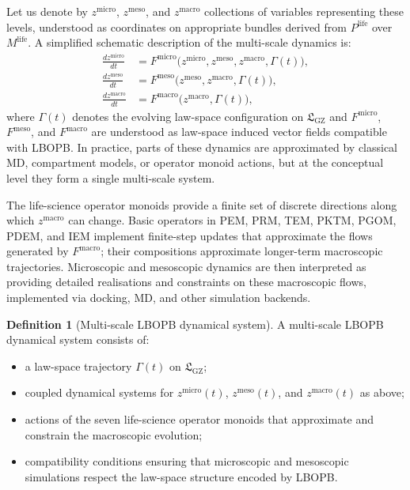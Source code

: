 \documentclass[11pt]{book}
\theoremstyle{plain}
\theoremstyle{definition}
\newtheorem{definition}[theorem]{Definition}
\theoremstyle{remark}
\newcommand{\GZLS}{\ensuremath{\mathfrak{L}_{\mathrm{GZ}}}}       \newcommand{\GZLT}{\ensuremath{M_{!w}}}                           \newcommand{\GZLOC}{\ensuremath{A_M}}                             \newcommand{\GZLCurv}{\ensuremath{\mathcal{F}_{\mathrm{law}}}}
\begin{document}
Let us denote by $z^{\mathrm{micro}}$, $z^{\mathrm{meso}}$, and
$z^{\mathrm{macro}}$ collections of variables representing these
levels, understood as coordinates on appropriate bundles derived from
$P^{\mathrm{life}}$ over $M^{\mathrm{life}}$. A simplified schematic
description of the multi-scale dynamics is:
\begin{align*}
  \frac{dz^{\mathrm{micro}}}{dt}
  &= F^{\mathrm{micro}} \bigl(
       z^{\mathrm{micro}}, z^{\mathrm{meso}},
       z^{\mathrm{macro}}, \Gamma(t)
     \bigr), \\
  \frac{dz^{\mathrm{meso}}}{dt}
  &= F^{\mathrm{meso}} \bigl(
       z^{\mathrm{meso}}, z^{\mathrm{macro}}, \Gamma(t)
     \bigr), \\
  \frac{dz^{\mathrm{macro}}}{dt}
  &= F^{\mathrm{macro}} \bigl(
       z^{\mathrm{macro}}, \Gamma(t)
     \bigr),
\end{align*}
where $\Gamma(t)$ denotes the evolving law-space configuration on
$\GZLS$ and $F^{\mathrm{micro}}$, $F^{\mathrm{meso}}$, and
$F^{\mathrm{macro}}$ are understood as law-space induced vector fields
compatible with LBOPB. In practice, parts of these dynamics are
approximated by classical MD, compartment models, or operator monoid
actions, but at the conceptual level they form a single multi-scale
system.

The life-science operator monoids provide a finite set of discrete
directions along which $z^{\mathrm{macro}}$ can change. Basic operators
in PEM, PRM, TEM, PKTM, PGOM, PDEM, and IEM implement finite-step
updates that approximate the flows generated by $F^{\mathrm{macro}}$;
their compositions approximate longer-term macroscopic trajectories.
Microscopic and mesoscopic dynamics are then interpreted as providing
detailed realisations and constraints on these macroscopic flows,
implemented via docking, MD, and other simulation backends.

\begin{definition}[Multi-scale LBOPB dynamical system]
A multi-scale LBOPB dynamical system consists of:
\begin{itemize}
  \item a law-space trajectory $\Gamma(t)$ on $\GZLS$;
  \item coupled dynamical systems for
        $z^{\mathrm{micro}}(t)$, $z^{\mathrm{meso}}(t)$, and
        $z^{\mathrm{macro}}(t)$ as above;
  \item actions of the seven life-science operator monoids that
        approximate and constrain the macroscopic evolution;
  \item compatibility conditions ensuring that microscopic and
        mesoscopic simulations respect the law-space structure
        encoded by LBOPB.
\end{itemize}
\end{definition}
\end{document}
